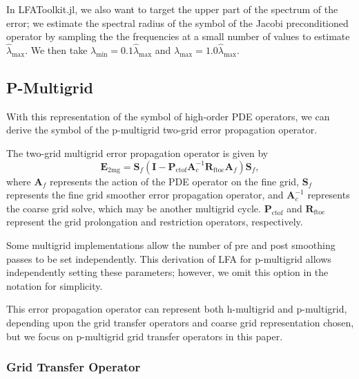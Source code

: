 \documentclass[review]{siamart190516}
\begin{document}
In LFAToolkit.jl, we also want to target the upper part of the spectrum of the error; we estimate the spectral radius of the symbol of the Jacobi preconditioned operator by sampling the the frequencies at a small number of values to estimate $\hat{\lambda}_{\text{max}}$.
We then take $\lambda_{\text{min}} = 0.1 \hat{\lambda}_{\text{max}}$ and $\lambda_{\text{max}} = 1.0 \hat{\lambda}_{\text{max}}$.

\subsection{P-Multigrid}\label{sec:multigrid}

With this representation of the symbol of high-order PDE operators, we can derive the symbol of the p-multigrid two-grid error propagation operator.

The two-grid multigrid error propagation operator is given by
\begin{equation}
\mathbf{E}_{\text{2mg}} = \mathbf{S}_f \left( \mathbf{I} - \mathbf{P}_{\text{ctof}} \mathbf{A}_c^{-1} \mathbf{R}_{\text{ftoc}} \mathbf{A}_f \right) \mathbf{S}_f,
\end{equation}
where $\mathbf{A}_f$ represents the action of the PDE operator on the fine grid, $\mathbf{S}_f$ represents the fine grid smoother error propagation operator, and $\mathbf{A}_c^{-1}$ represents the coarse grid solve, which may be another multigrid cycle.
$\mathbf{P}_{\text{ctof}}$ and $\mathbf{R}_{\text{ftoc}}$ represent the grid prolongation and restriction operators, respectively.

Some multigrid implementations allow the number of pre and post smoothing passes to be set independently.
This derivation of LFA for p-multigrid allows independently setting these parameters; however, we omit this option in the notation for simplicity.

This error propagation operator can represent both h-multigrid and p-multigrid, depending upon the grid transfer operators and coarse grid representation chosen, but we focus on p-multigrid grid transfer operators in this paper.

\subsubsection{Grid Transfer Operator}\label{sec:grids}
\end{document}
